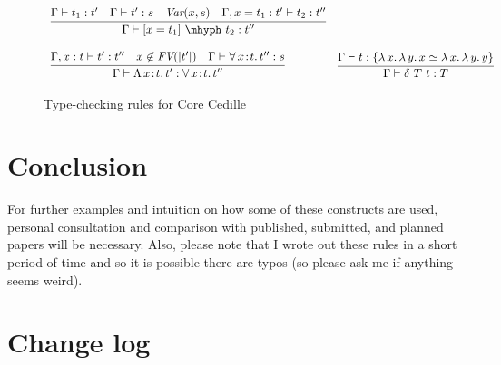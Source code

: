 \documentclass{article}
\newcommand{\abs}[4]{{#1}\, #2\! : \! #3.\, #4}
\newcommand{\absu}[3]{{#1}\, #2.\, #3}
\begin{document}
\begin{figure}
\[\begin{array}{lll}
    \multicolumn{2}{l}{
    \infer{\Gamma\vdash [ x = t_1 ]\ \mhyph\ t_2 : t''}{\Gamma\vdash t_1 : t' \quad \Gamma \vdash t' : s \quad \textit{Var}(x,s) \quad
      \Gamma, x = t_1 : t' \vdash t_2 : t''} } &
   \ 
    \\ \\
    \multicolumn{2}{l}{
      \infer{\Gamma\vdash\abs{\Lambda}{x}{t}{t'} : \abs{\forall}{x}{t}{t''}}{\Gamma,x:t\vdash t':t'' \quad x\not\in\textit{FV}(|t'|)\quad \Gamma \vdash \abs{\forall}{x}{t}{t''} : s}}&
    \infer{\Gamma\vdash \delta\ T\ t : T}{\Gamma\vdash t : \{ \absu{\lambda}{x}{\absu{\lambda}{y}{x}} \simeq \absu{\lambda}{x}{\absu{\lambda}{y}{y}}\} } 

  \end{array}
  \]
  \caption{Type-checking rules for Core Cedille}
  \label{fig:rules}
\end{figure}

\section{Conclusion}

For further examples and intuition on how some of these constructs are
used, personal consultation and comparison with published, submitted,
and planned papers will be necessary.  Also, please note that I wrote
out these rules in a short period of time and so it is possible there
are typos (so please ask me if anything seems weird).





\appendix 
\section{Change log}
\end{document}
